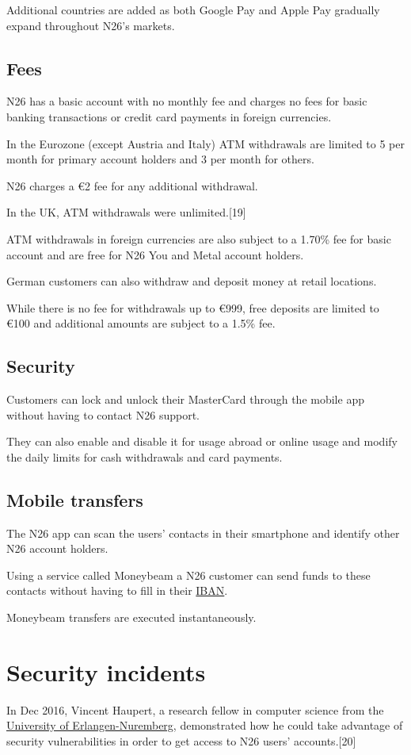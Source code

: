 \documentclass[onsided]{book}
\numberwithin{equation}{section}
\begin{document}
Additional countries are added as both Google Pay and Apple Pay gradually expand throughout N26's markets.

\subsection{Fees}
N26 has a basic account with no monthly fee and charges no fees for basic banking transactions or credit card payments in foreign currencies.

In the Eurozone (except Austria and Italy) ATM withdrawals are limited to 5 per month for primary account holders and 3 per month for others.

N26 charges a €2 fee for any additional withdrawal.

In the UK, ATM withdrawals were unlimited.[19]

%
ATM withdrawals in foreign currencies are also subject to a 1.70\% fee for basic account and are free for N26 You and Metal account holders.

%
German customers can also withdraw and deposit money at retail locations.

While there is no fee for withdrawals up to €999, free deposits are limited to €100 and additional amounts are subject to a 1.5\% fee.

\subsection{Security}
Customers can lock and unlock their MasterCard through the mobile app without having to contact N26 support.

They can also enable and disable it for usage abroad or online usage and modify the daily limits for cash withdrawals and card payments. 

\subsection{Mobile transfers}
The N26 app can scan the users' contacts in their smartphone and identify other N26 account holders.

Using a service called Moneybeam a N26 customer can send funds to these contacts without having to fill in their \href{https://en.wikipedia.org/wiki/IBAN}{IBAN}.

Moneybeam transfers are executed instantaneously.

\section{Security incidents}
In Dec 2016, Vincent Haupert, a research fellow in computer science from the \href{https://en.wikipedia.org/wiki/University_of_Erlangen-Nuremberg}{University of Erlangen-Nuremberg}, demonstrated how he could take advantage of security vulnerabilities in order to get access to N26 users' accounts.[20]
\end{document}
